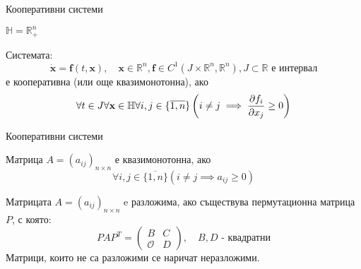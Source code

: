 \begin{frame}[t]{Кооперативни системи}
  \begin{definition}
    $\mathbb{H} = \mathbb{R}_{+}^n$
  \end{definition}
  \begin{definition}
    \label{def:Cooperative}
    Системата:
    \begin{equation}
      \label{eq:Cooperative}
      \dot{\mathbf{x}} = \mathbf{f}(t, \mathbf{x}),  \quad \mathbf{x} \in \mathbb{R}^n, \mathbf{f} \in C^1(J \times \mathbb{R}^n, \mathbb{R}^n), J \subset \mathbb{R} \text{ е интервал}
    \end{equation}
    е кооперативна (или още квазимонотонна), ако
    \begin{equation}
      \forall{t \in J}\forall{\mathbf{x} \in \mathbb{H}}\forall{i,j \in \{\overline{1,n}\}}\left(i \neq j \implies \pdv{f_i}{x_j}(t, \mathbf{x}) \geq 0\right)
    \end{equation}
  \end{definition}

\end{frame}

\begin{frame}[t]{Кооперативни системи}
  \begin{definition}
    Матрица $A=(a_{ij})_{n \times n}$ е квазимонотонна, ако
    \begin{equation*}
      \forall{i,j \in \{\overline{1,n}\}} \left(i \neq j \implies a_{ij} \geq 0\right)
    \end{equation*}
  \end{definition}
  \begin{definition}
    Матрицата $A=(a_{ij})_{n \times n}$ e разложима, ако съществува пермутационна матрица $P$, с която:
    \begin{equation*}
      PAP^T =
      \begin{pmatrix}
        B & C \\
        \mathscr{O} & D
      \end{pmatrix}, \quad B, D \text{ - квадратни}
    \end{equation*}
    Матрици, които не са разложими се наричат неразложими.
  \end{definition}
\end{frame}

